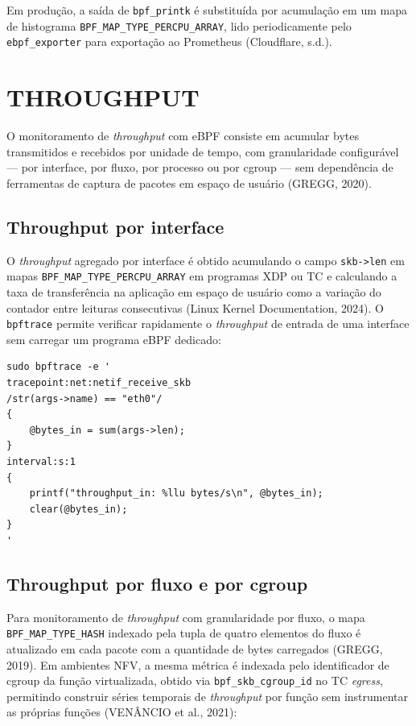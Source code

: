 Em produção, a saída de \texttt{bpf\_printk} é substituída por acumulação em um
mapa de histograma \texttt{BPF\_MAP\_TYPE\_PERCPU\_ARRAY}, lido periodicamente pelo
\texttt{ebpf\_exporter} para exportação ao Prometheus (Cloudflare, s.d.).

\section{THROUGHPUT}

O monitoramento de \textit{throughput} com eBPF consiste em acumular bytes
transmitidos e recebidos por unidade de tempo, com granularidade configurável — por
interface, por fluxo, por processo ou por cgroup — sem dependência de ferramentas de
captura de pacotes em espaço de usuário (GREGG, 2020).

\subsection*{Throughput por interface}

O \textit{throughput} agregado por interface é obtido acumulando o campo
\texttt{skb->len} em mapas \texttt{BPF\_MAP\_TYPE\_PERCPU\_ARRAY} em programas XDP
ou TC e calculando a taxa de transferência na aplicação em espaço de usuário como a
variação do contador entre leituras consecutivas (Linux Kernel Documentation, 2024).
O \texttt{bpftrace} permite verificar rapidamente o \textit{throughput} de entrada de
uma interface sem carregar um programa eBPF dedicado:

\begin{lstlisting}[caption={Throughput de entrada por interface com bpftrace.}, label=lst:obs-throughput-iface]
sudo bpftrace -e '
tracepoint:net:netif_receive_skb
/str(args->name) == "eth0"/
{
    @bytes_in = sum(args->len);
}
interval:s:1
{
    printf("throughput_in: %llu bytes/s\n", @bytes_in);
    clear(@bytes_in);
}
'
\end{lstlisting}

\subsection*{Throughput por fluxo e por cgroup}

Para monitoramento de \textit{throughput} com granularidade por fluxo, o mapa
\texttt{BPF\_MAP\_TYPE\_HASH} indexado pela tupla de quatro elementos do fluxo é
atualizado em cada pacote com a quantidade de bytes carregados (GREGG, 2019). Em
ambientes NFV, a mesma métrica é indexada pelo identificador de cgroup da função
virtualizada, obtido via \texttt{bpf\_skb\_cgroup\_id} no TC \textit{egress}, permitindo
construir séries temporais de \textit{throughput} por função sem instrumentar as
próprias funções (VENÂNCIO et al., 2021):

